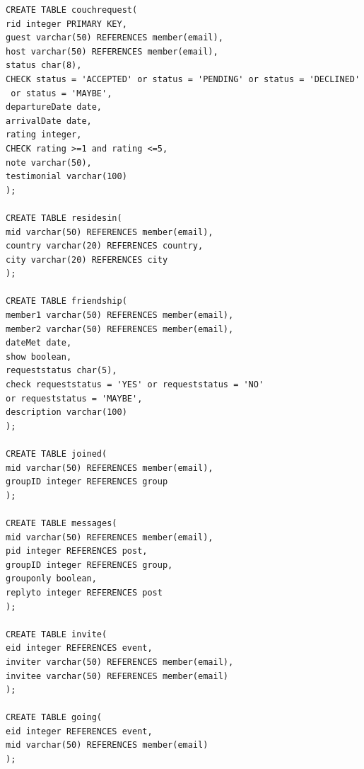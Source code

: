 \documentclass[10pt,a4paper]{article}
\begin{document}
\begin{enumerate}
\begin{verbatim}
CREATE TABLE couchrequest(
rid integer PRIMARY KEY,
guest varchar(50) REFERENCES member(email),
host varchar(50) REFERENCES member(email),
status char(8),
CHECK status = 'ACCEPTED' or status = 'PENDING' or status = 'DECLINED'
 or status = 'MAYBE',
departureDate date,
arrivalDate date, 
rating integer,
CHECK rating >=1 and rating <=5,
note varchar(50),
testimonial varchar(100)
);

CREATE TABLE residesin(
mid varchar(50) REFERENCES member(email),
country varchar(20) REFERENCES country,
city varchar(20) REFERENCES city
);

CREATE TABLE friendship(
member1 varchar(50) REFERENCES member(email),
member2 varchar(50) REFERENCES member(email),
dateMet date,
show boolean,
requeststatus char(5),
check requeststatus = 'YES' or requeststatus = 'NO' 
or requeststatus = 'MAYBE',
description varchar(100)
);

CREATE TABLE joined(
mid varchar(50) REFERENCES member(email),
groupID integer REFERENCES group
);

CREATE TABLE messages(
mid varchar(50) REFERENCES member(email),
pid integer REFERENCES post,
groupID integer REFERENCES group,
grouponly boolean,
replyto integer REFERENCES post
);

CREATE TABLE invite(
eid integer REFERENCES event,
inviter varchar(50) REFERENCES member(email),
invitee varchar(50) REFERENCES member(email)
);

CREATE TABLE going(
eid integer REFERENCES event,
mid varchar(50) REFERENCES member(email)
);
\end{verbatim}
\end{enumerate}
\end{document}

